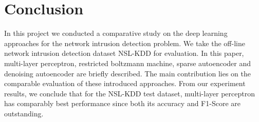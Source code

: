 \section{Conclusion}
In this project we conducted a comparative study on the deep learning approaches
for the network intrusion detection problem.
We take the off-line network intrusion detection dataset NSL-KDD for evaluation.
In this paper, multi-layer perceptron, restricted boltzmann machine, sparse autoencoder
and denoising autoencoder are briefly described.
The main contribution lies on the comparable evaluation of these introduced approaches.
From our experiment results, we conclude that for the NSL-KDD test dataset,
multi-layer perceptron has comparably best performance since both its accuracy and F1-Score
are outstanding.
